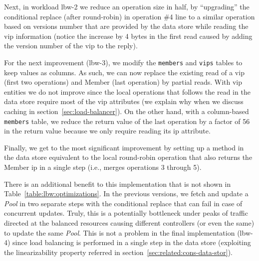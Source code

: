 Next, in workload lbw-2 we reduce an operation size in half, by ``upgrading'' the conditional replace (after round-robin) in operation \#4 line to a similar operation based on  versions number that are  provided by the data store while reading the \gls{vip} information (notice the increase by 4 bytes in the first read caused by adding the version number of the \gls{vip} to the reply).  

For the next improvement (lbw-3), we modify the \texttt{members} and \texttt{vips} tables to keep values as columns. 
As such, we can now replace the existing read of a \gls{vip} (first two operations) and Member (last operation) by partial reads. 
With \gls{vip} entities we do not improve since the local operations that follows the read in the
data store require most of the \gls{vip} attributes (we explain why when we discuss caching in section~\ref{sec:load-balancer}). 
On the other hand,  with a column-based \texttt{members} table, we reduce the return value of the last operation  by a factor of 56 in the return value because we only require reading its \gls{ip} attribute. 

Finally, we get to the most significant improvement by setting up a method in the data store equivalent to the local round-robin operation that also returns the Member \gls{ip} in a single step (i.e., merges operations 3 through 5). 

There is an additional benefit to this implementation that is not shown in Table~\ref{table:lbw:optimizations}. 
In the previous versions, we fetch and update a \emph{Pool} in two separate steps with the conditional replace that can fail in case of concurrent updates.
Truly, this is a potentially bottleneck under peaks of traffic directed at the balanced resources causing different  controllers (or even the same) to update the same \emph{Pool}.
This is not a problem in the final implementation (lbw-4) since load balancing is performed in a single step in the data store (exploiting the linearizability property referred in section~\ref{sec:related:cons-data-stor}). 


